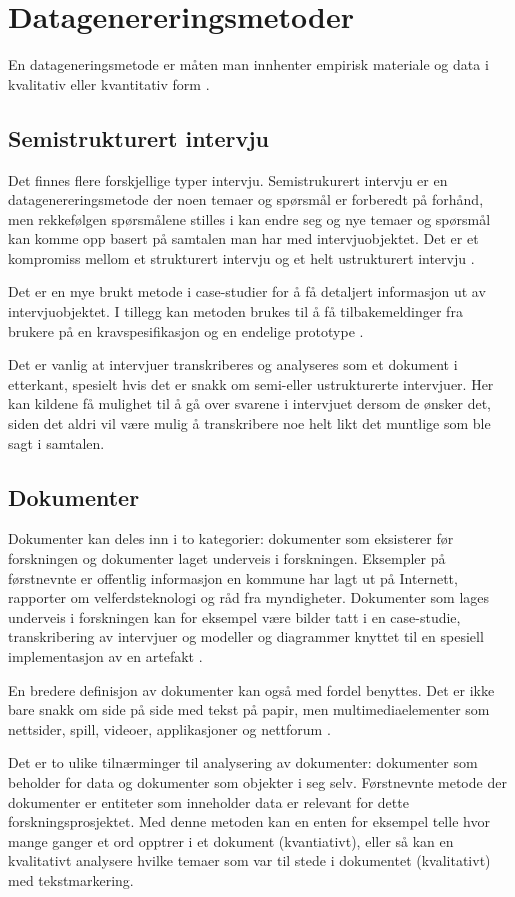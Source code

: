 \section{Datagenereringsmetoder}
En datageneringsmetode er måten man innhenter empirisk materiale og data i kvalitativ
eller kvantitativ form \citep[s. 36]{oates}.

\subsection{Semistrukturert intervju}
Det finnes flere forskjellige typer intervju. Semistrukurert intervju er en datagenereringsmetode
der noen temaer og spørsmål er forberedt på forhånd, men rekkefølgen spørsmålene stilles i kan endre seg
og nye temaer og spørsmål kan komme opp basert på samtalen man har med intervjuobjektet. Det er et
kompromiss mellom et strukturert intervju og et helt ustrukturert intervju \citep[s. 188]{oates}.

Det er en mye brukt metode i case-studier for å få detaljert informasjon ut av intervjuobjektet.
I tillegg kan metoden brukes til å få tilbakemeldinger fra brukere på en kravspesifikasjon og en
endelige prototype \citep[s. 187]{oates}.

Det er vanlig at intervjuer transkriberes og analyseres som et dokument i etterkant, spesielt
hvis det er snakk om semi-eller ustrukturerte intervjuer. Her kan kildene
få mulighet til å gå over svarene i intervjuet dersom de ønsker det, siden det aldri vil være mulig
å transkribere noe helt likt det muntlige som ble sagt i samtalen.

\subsection{Dokumenter}
Dokumenter kan deles inn i to kategorier: dokumenter som eksisterer før forskningen og dokumenter laget underveis
i forskningen. Eksempler på førstnevnte er offentlig informasjon en kommune har lagt ut på Internett, rapporter
om velferdsteknologi og råd fra myndigheter. Dokumenter som lages underveis i forskningen kan for eksempel være
bilder tatt i en case-studie, transkribering av intervjuer
og modeller og diagrammer knyttet til en spesiell implementasjon av en artefakt \citep[s. 233-234]{oates}.

En bredere definisjon av dokumenter kan også med fordel benyttes. Det er ikke bare snakk om side på side med tekst på papir,
men multimediaelementer som nettsider, spill, videoer, applikasjoner og nettforum \citep[s. 235]{oates}.

Det er to ulike tilnærminger til analysering av dokumenter: dokumenter som beholder for data og dokumenter som objekter i seg selv.
Førstnevnte metode der dokumenter er entiteter som inneholder data er relevant for dette forskningsprosjektet.
Med denne metoden kan en enten for eksempel telle hvor mange ganger et ord opptrer i et dokument (kvantiativt),
eller så kan en kvalitativt analysere hvilke temaer som var til stede i dokumentet (kvalitativt) med tekstmarkering.
